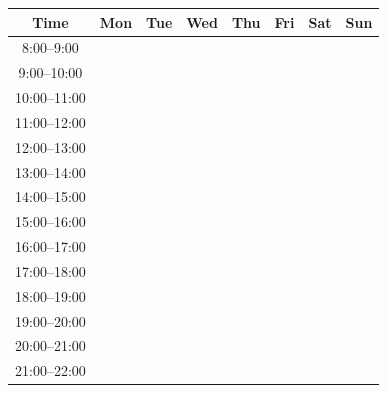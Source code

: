 \documentclass{letter}
\begin{document}
\begin{letter}{}
\begin{center}
\begin{tabular}{|c|c|c|c|c|c|c|c|}
\hline 
Time & Mon & Tue & Wed & Thu & Fri & Sat & Sun\tabularnewline
\hline 
\hline 
8:00--9:00 &  &  &  &  &  &  & \tabularnewline
\hline 
9:00--10:00 &  &  &  &  &  &  & \tabularnewline
\hline 
10:00--11:00 &  &  &  &  &  &  & \tabularnewline
\hline 
11:00--12:00 &  &  &  &  &  &  & \tabularnewline
\hline 
12:00--13:00 &  &  &  &  &  &  & \tabularnewline
\hline 
13:00--14:00 &  &  &  &  &  &  & \tabularnewline
\hline 
14:00--15:00 &  &  &  &  &  &  & \tabularnewline
\hline 
15:00--16:00 &  &  &  &  &  &  & \tabularnewline
\hline 
16:00--17:00 &  &  &  &  &  &  & \tabularnewline
\hline 
17:00--18:00 &  &  &  &  &  &  & \tabularnewline
\hline 
18:00--19:00 &  &  &  &  &  &  & \tabularnewline
\hline 
19:00--20:00 &  &  &  &  &  &  & \tabularnewline
\hline 
20:00--21:00 &  &  &  &  &  &  & \tabularnewline
\hline 
21:00--22:00 &  &  &  &  &  &  & \tabularnewline
\hline 
\end{tabular}
\end{center}
\end{letter}
\end{document}
